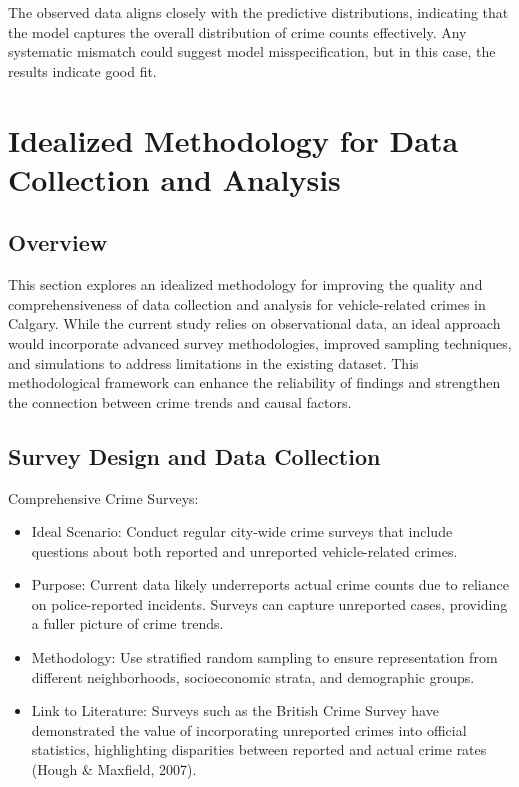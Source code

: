 \documentclass[
  letterpaper,
  DIV=11,
  numbers=noendperiod]{scrartcl}
\begin{document}
The observed data aligns closely with the predictive distributions,
indicating that the model captures the overall distribution of crime
counts effectively. Any systematic mismatch could suggest model
misspecification, but in this case, the results indicate good fit.

\section{Idealized Methodology for Data Collection and
Analysis}\label{sec-ideal-meth}

\subsection{Overview}\label{overview-3}

This section explores an idealized methodology for improving the quality
and comprehensiveness of data collection and analysis for
vehicle-related crimes in Calgary. While the current study relies on
observational data, an ideal approach would incorporate advanced survey
methodologies, improved sampling techniques, and simulations to address
limitations in the existing dataset. This methodological framework can
enhance the reliability of findings and strengthen the connection
between crime trends and causal factors.

\subsection{Survey Design and Data
Collection}\label{survey-design-and-data-collection}

Comprehensive Crime Surveys:

\begin{itemize}
\item
  Ideal Scenario: Conduct regular city-wide crime surveys that include
  questions about both reported and unreported vehicle-related crimes.
\item
  Purpose: Current data likely underreports actual crime counts due to
  reliance on police-reported incidents. Surveys can capture unreported
  cases, providing a fuller picture of crime trends.
\item
  Methodology: Use stratified random sampling to ensure representation
  from different neighborhoods, socioeconomic strata, and demographic
  groups.
\item
  Link to Literature: Surveys such as the British Crime Survey have
  demonstrated the value of incorporating unreported crimes into
  official statistics, highlighting disparities between reported and
  actual crime rates (Hough \& Maxfield, 2007).
\end{itemize}
\end{document}
